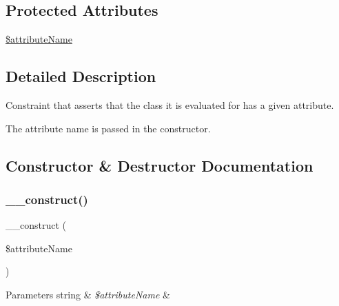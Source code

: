 \subsection*{Protected Attributes}
\begin{DoxyCompactItemize}
\item 
\mbox{\hyperlink{class_p_h_p_unit___framework___constraint___class_has_attribute_a257bb27c360747a7f80b842e7109f54c}{\$attribute\+Name}}
\end{DoxyCompactItemize}


\subsection{Detailed Description}
Constraint that asserts that the class it is evaluated for has a given attribute.

The attribute name is passed in the constructor. 

\subsection{Constructor \& Destructor Documentation}
\mbox{\label{class_p_h_p_unit___framework___constraint___class_has_attribute_ad932c6cae0432a4fc94b6f84a0be9464}} 
\subsubsection{\texorpdfstring{\+\_\+\+\_\+construct()}{\_\_construct()}}
{\footnotesize\ttfamily \+\_\+\+\_\+construct (\begin{DoxyParamCaption}\item[{}]{\$attribute\+Name }\end{DoxyParamCaption})}


\begin{DoxyParams}[1]{Parameters}
string & {\em \$attribute\+Name} & \\
\hline
\end{DoxyParams}


